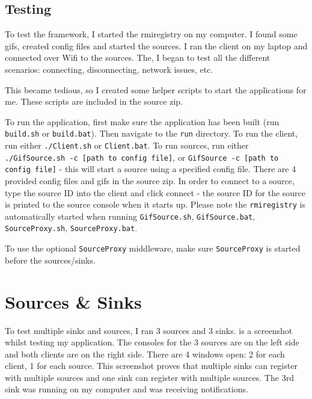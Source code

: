 \documentclass[a4paper]{article}
\begin{document}
\subsection{Testing}
To test the framework, I started the rmiregistry on my computer.
I found some gifs, created config files and started the sources.
I ran the client on my laptop and connected over Wifi to the sources.
The, I began to test all the different scenarios: connecting, disconnecting, network issues, etc.

This became tedious, so I created some helper scripts to start the applications for me.
These scripts are included in the source zip.

To run the application, first make sure the application has been built (run \texttt{build.sh} or \texttt{build.bat}).
Then navigate to the \texttt{run} directory.
To run the client, run either \texttt{./Client.sh} or \texttt{Client.bat}.
To run sources, run either \texttt{./GifSource.sh -c [path to config file]}, or \texttt{GifSource -c [path to config file]} - this will start a source using a specified config file.
There are 4 provided config files and gifs in the source zip.
In order to connect to a source, type the source ID into the client and click connect - the source ID for the source is printed to the source console when it starts up.
Please note the \texttt{rmiregistry} is automatically started when running \texttt{GifSource.sh}, \texttt{GifSource.bat}, \texttt{SourceProxy.sh}, \texttt{SourceProxy.bat}.

To use the optional \texttt{SourceProxy} middleware, make sure \texttt{SourceProxy} is started before the sources/sinks.



\section{Sources \& Sinks}
To test multiple sinks and sources, I ran 3 sources and 3 sinks.
 is a screenshot whilst testing my application.
The consoles for the 3 sources are on the left side and both clients are on the right side.
There are 4 windows open: 2 for each client, 1 for each source.
This screenshot proves that multiple sinks can register with multiple sources and one sink can register with multiple sources.
The 3rd sink was running on my computer and was receiving notifications.
\end{document}
